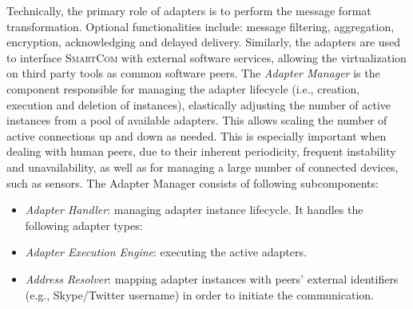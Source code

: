 \documentclass{llncs}
\newcommand{\mdl}{\textsc{SmartCom}}
\begin{document}
    Technically, the primary role of adapters is to perform the message format transformation. Optional functionalities include: message filtering, aggregation, encryption, acknowledging and delayed delivery. Similarly, the adapters are used to interface \mdl{} with external software services, allowing the virtualization on third party tools as common software peers.
    The \emph{Adapter Manager} is the component responsible for managing the adapter lifecycle (i.e., creation, execution and deletion of instances), elastically adjusting the number of active instances from a pool of available adapters. This allows scaling the number of active connections up and down as needed. This is especially important when dealing with human peers, due to their inherent periodicity, frequent instability and unavailability, as well as for managing a large number of connected devices, such as sensors. The Adapter Manager consists of following subcomponents: 
    \begin{itemize}[$\bullet$]
      \item \emph{Adapter Handler}: managing adapter instance lifecycle. It handles the following adapter types:  
      \item \emph{Adapter Execution Engine}: executing the active adapters.
      \item \emph{Address Resolver}: mapping adapter instances with peers' external identifiers (e.g., Skype/Twitter username) in order to initiate the communication.
    \end{itemize}
\end{document}
